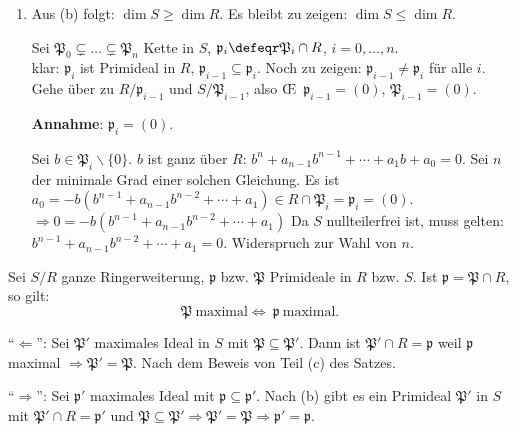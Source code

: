 \begin{Bew}
\begin{enumerate}
\item Aus (b) folgt: $\dim{S} \geq\dim{R}$. Es bleibt zu
zeigen: $\dim{S} \leq \dim{R}$.

Sei $\mathfrak{P}_0\subsetneq \ldots \subsetneq \mathfrak{P}_n$ Kette in $S$, 
$\mathfrak{p}_i\defeqr \mathfrak{P}_i\cap R$, $i=0,\ldots,n$.\\
klar: $\mathfrak{p}_i$ ist Primideal in $R$, $\mathfrak{p}_{i-1}\subseteq \mathfrak{p}_i$.
Noch zu zeigen: $\mathfrak{p}_{i-1}\neq \mathfrak{p}_i$ f\"ur alle $i$. Gehe \"uber zu
$R/\mathfrak{p}_{i-1}$ und $S/\mathfrak{P}_{i-1}$, also \OE\ $\mathfrak{p}_{i-1}=(0)$,
$\mathfrak{P}_{i-1}=(0)$.

\textbf{Annahme}: $\mathfrak{p}_i=(0)$.

Sei $b\in \mathfrak{P}_{i}\backslash \{0\}$. $b$ ist ganz \"uber $R$: $b^n+a_{n-1}b^{n-1}+\cdots+a_1b+a_0=0$. Sei $n$ der minimale Grad einer solchen Gleichung.
Es ist $a_0=-b(b^{n-1}+a_{n-1}b^{n-2}+\cdots+a_1)\in R\cap \mathfrak{P}_i=\mathfrak{p}_i=(0)$.
$\Rightarrow 0=-b(b^{n-1}+a_{n-1}b^{n-2}+\cdots+a_1)$
Da $S$ nullteilerfrei ist, muss gelten: $b^{n-1}+a_{n-1}b^{n-2}+\cdots+a_1=0$. Widerspruch zur
Wahl von $n$.

\end{enumerate}
\end{Bew}

\begin{Folg}
\label{2.26}
Sei $S/R$ ganze Ringerweiterung, $\mathfrak{p}$ bzw. $\mathfrak{P}$ Primideale in $R$ bzw. $S$.
Ist $\mathfrak{p}=\mathfrak{P}\cap R$, so gilt:
\[
\mathfrak{P}\ \text{maximal} \Leftrightarrow\ \mathfrak{p}\ \text{maximal}.
\]
\end{Folg}

\begin{Bew}
``$\Leftarrow$'': Sei $\mathfrak{P}'$ maximales Ideal in $S$ mit 
$\mathfrak{P}\subseteq \mathfrak P'$. Dann ist $\mathfrak{P}'\cap R=\mathfrak{p}$ weil
$\mathfrak{p}$ maximal $\Rightarrow\mathfrak{P'}=\mathfrak{P}$. Nach dem Beweis
von Teil (c) des Satzes.

``$\Rightarrow$'': Sei $\mathfrak{p}'$ maximales Ideal mit $\mathfrak{p}\subseteq \mathfrak{p'}$.
Nach (b) gibt es ein Primideal $\mathfrak{P}'$ in $S$ mit $\mathfrak{P}'\cap R=\mathfrak{p}'$
und $\mathfrak{P}\subseteq \mathfrak{P}'\Rightarrow \mathfrak{P'}=\mathfrak{P}\Rightarrow
\mathfrak{p}'=\mathfrak{p}$.

\end{Bew}

